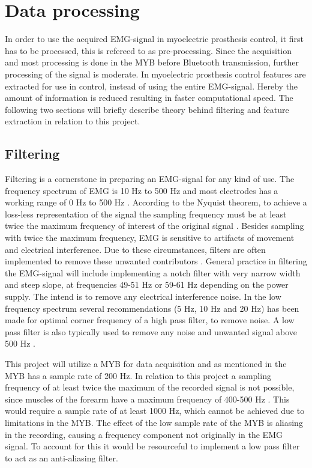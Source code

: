 \section{Data processing} \label{sec:BG:dataProcessing}


In order to use the acquired EMG-signal in myoelectric prosthesis control, it first has to be processed, this is refereed to as pre-processing. Since the acquisition and most processing is done in the MYB before Bluetooth transmission, further processing of the signal is moderate. In myoelectric prosthesis control features are extracted for use in control, instead of using the entire EMG-signal. Hereby the amount of information is reduced resulting in faster computational speed. The following two sections will briefly describe theory behind filtering and feature extraction in relation to this project.  


\subsection{Filtering} \label{sub:BG:filtering} %

Filtering is a cornerstone in preparing an EMG-signal for any kind of use. The frequency spectrum of EMG is 10 Hz to 500 Hz and most electrodes has a working range of 0 Hz to 500 Hz \cite{DeLuca2010}. According to the Nyquist theorem, to achieve a loss-less representation of the signal the sampling frequency must be at least twice the maximum frequency of interest of the original signal \cite{Pozzo2004}. Besides sampling with twice the maximum frequency, EMG is sensitive to artifacts of movement and electrical interference. Due to these circumstances, filters are often implemented to remove these unwanted contributors \cite{DeLuca2010}. 
General practice in filtering the EMG-signal will include implementing a notch filter with very narrow width and steep slope, at frequencies 49-51 Hz or 59-61 Hz depending on the power supply. The intend is to remove any electrical interference noise. In the low frequency spectrum several recommendations (5 Hz, 10 Hz and 20 Hz) has been made for optimal corner frequency of a high pass filter, to remove noise. A low pass filter is also typically used to remove any noise and unwanted signal above 500 Hz \cite{Cram2012}. 

This project will utilize a MYB for data acquisition and as mentioned in  the MYB has a sample rate of 200 Hz. In relation to this project a sampling frequency of at least twice the maximum of the recorded signal is not possible, since muscles of the forearm have a maximum frequency of 400-500 Hz \cite{Cram2012}. This would require a sample rate of at least 1000 Hz, which cannot be achieved due to limitations in the MYB. The effect of the low sample rate of the MYB is aliasing in the recording, causing a frequency component not originally in the EMG signal. To account for this it would be resourceful to implement a low pass filter to act as an anti-aliasing filter.  

